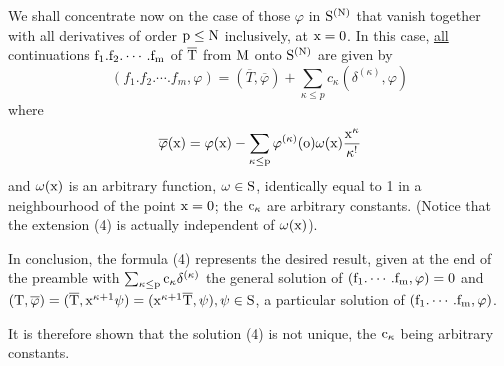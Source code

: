 \documentclass[12pt]{article}
\begin{document}
We shall concentrate now on the case of those $\varphi$ in $\rm S^{(N)}$
that vanish together with
all derivatives of order $\rm p\leq N$ inclusively, at $\rm x=0$. In this
case, \underline{all}
continuations
  $\rm f_1. f_2. \cdots . f_m$ of $\rm \overline T$ from $\rm M$ onto $\rm
S^{(N)}$ are given by
\begin{equation}
(f_1. f_2 . \cdots . f_m, \varphi ) = (\overline{T}, \overline{\varphi}) +
\sum_{\kappa \leq p}
c_\kappa (\delta^{(\kappa)}, \varphi)
\end{equation}
where
$$\rm \overline{\varphi} (x) = \varphi (x) - \sum_{\kappa \leq p}
\varphi^{(\kappa )} (o) \omega (x)
\frac{x^\kappa}{\kappa^!}$$
and $\rm \omega (x)$ is an arbitrary function, $\rm \omega \in S$,
identically equal to 1 in a
neighbourhood of the point $\rm x =0$; the $\rm c_\kappa$ are arbitrary
constants. (Notice that the
extension (4) is actually independent of $\rm \omega (x)$).

In conclusion, the formula (4) represents the desired result, given at the
end of the preamble
with $\rm \sum_{\kappa \leq p} c_\kappa \delta^{(\kappa)}$ the general
solution of $\rm (f_1. \cdots .
f_m, \varphi) =0$ and $\rm ( {T}, \overline{\varphi} ) = (\overline{T},
x^{\kappa +1} \psi) =
(x^{\kappa +1} \overline{T}, \psi ), \psi \in S$, a particular solution of
$\rm (f_1.\cdots . f_m,
\varphi )$.

It is therefore shown that the solution (4) is not unique, the $\rm
c_\kappa$ being arbitrary
constants.
\end{document}
